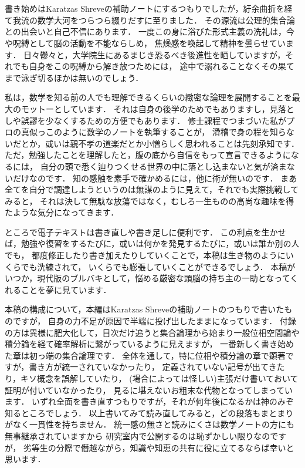 \chapter*{}
書き始めはKaratzas Shreveの補助ノートにするつもりでしたが，紆余曲折を経て我流の数学大河をつらつら綴りだすに至りました．
その源流は公理的集合論との出会いと自己不信にあります．
一度この身に浴びた形式主義の洗礼は，今や呪縛として脳の活動を不能ならしめ，
焦燥感を喚起して精神を曇らせています．
日々鬱々と，大学院生にあるまじき恐るべき後進性を晒していますが，それでも自身をこの呪縛から解き放つためには，
途中で溺れることなくその果てまで泳ぎ切るほかは無いのでしょう．

私は，数学を知る前の人でも理解できるくらいの緻密な論理を展開することを最大のモットーとしています．
それは自身の後学のためでもありますし，見落としや誤謬を少なくするための方便でもあります．
修士課程でつまづいた私がプロの真似っこのように数学のノートを執筆することが，
滑稽で身の程を知らないだとか，或いは親不孝の道楽だとか小憎らしく思われることは先刻承知です．
ただ，勉強したことを理解したと，腹の底から自信をもって宣言できるようになるには，
自分の頭で悉く辿りつくせる世界の中に落とし込まないと気が済まないだけなのです．
知の感触を素手で確かめるには，他に術が無いのです．
まあ全てを自分で調達しようというのは無謀のように見えて，それでも実際挑戦してみると，
それは決して無駄な放蕩ではなく，むしろ一生ものの高尚な趣味を得たような気分になってきます．

ところで電子テキストは書き直しや書き足しに便利です．
この利点を生かせば，勉強や復習をするたびに，或いは何かを発見するたびに，或いは誰か別の人でも，
都度修正したり書き加えたりしていくことで，本稿は生き物のようにいくらでも洗練されて，
いくらでも膨張していくことができるでしょう．
本稿がいつか，現代版のブルバキとして，悩める厳密な頭脳の持ち主の一助となってくれることを夢に見ています．

本稿の構成について，本編はKaratzas Shreveの補助ノートのつもりで書いたものですが，
自身の力不足が原因で半端に投げ出したままになっています．
付録の方は異様に肥大化して，目次だけ追うと集合論理から始まり一般位相空間論や積分論を経て確率解析に繋がっているように見えますが，
一番新しく書き始めた章は初っ端の集合論理です．
全体を通して，特に位相や積分論の章で顕著ですが，書き方が統一されていなかったり，
定義されていない記号が出てきたり，キソ概念を誤解していたり，
(場合によっては怪しい)主張だけ書いておいて証明が付いていなかったり，
見るに堪えないお粗末な代物となってしまっています．
いずれ全面を書き直すつもりですが，それが何年後になるかは神のみぞ知るところでしょう．
以上書いてみて読み直してみると，どの段落もまとまりがなく一貫性を持ちません．
統一感の無さと読みにくさは数学ノートの方にも無事継承されていますから
研究室内で公開するのは恥ずかしい限りなのですが，
劣等生の分際で僭越ながら，知識や知恵の共有に役に立てるならば幸いと思います．
\\
\\
\\
